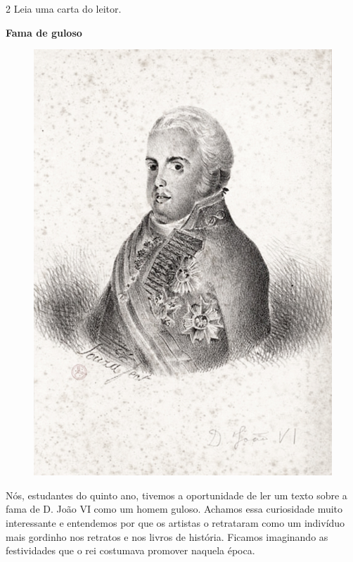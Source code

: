 \num{2} Leia uma carta do leitor.

\begin{myquote}
\textbf{Fama de guloso}

\begin{figure}
\includegraphics[width=.4\textwidth]{./media/image23b.jpg}
\end{figure}

Nós, estudantes do quinto ano, tivemos a oportunidade de ler um texto sobre a fama de D. João VI como um homem guloso. Achamos essa curiosidade muito interessante e entendemos por que os artistas o retrataram como um indivíduo mais gordinho nos retratos e nos livros de história. Ficamos imaginando as festividades que o rei costumava promover naquela época.

\end{myquote}

